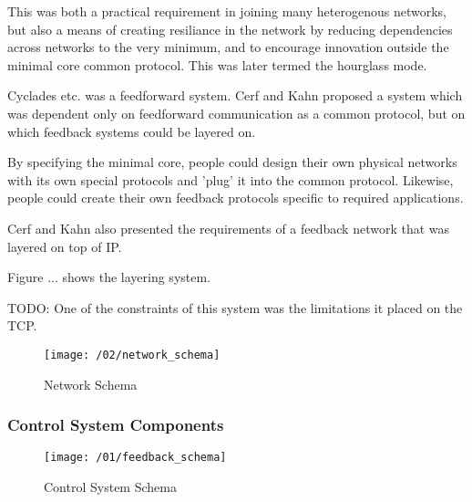 This was both a practical requirement in joining many heterogenous networks, but also a means of
creating resiliance in the network by reducing dependencies across networks to the very minimum, and
to encourage innovation outside the minimal core common protocol. This was later termed the
hourglass mode.

Cyclades etc. was a feedforward system. Cerf and Kahn proposed a system which was dependent only on
feedforward communication as a common protocol, but on which feedback systems could be layered on.

By specifying the minimal core, people could design their own physical networks with its own special
protocols and 'plug' it into the common protocol. Likewise, people could create their own feedback
protocols specific to required applications.

Cerf and Kahn also presented the requirements of a feedback network that was layered on top of IP. 

Figure ... shows the layering system. 


TODO: One of the constraints of this system was the limitations it placed on the TCP.






% 

\begin{figure}[H]
\texttt{[image: /02/network\_schema]}
\caption{Network Schema}
\label{fig:network_schema}
\end{figure}

\subsubsection{Control System Components}

\begin{figure}[H]
\texttt{[image: /01/feedback\_schema]}
\caption{Control System Schema}
\label{fig:feedback_schema}
\end{figure}

